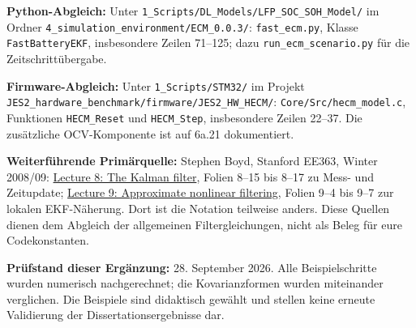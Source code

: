 \textbf{Python-Abgleich:} Unter \texttt{1\_Scripts/DL\_Models/LFP\_SOC\_SOH\_Model/} im Ordner \texttt{4\_simulation\_environment/ECM\_0.0.3/}: \texttt{fast\_ecm.py}, Klasse \texttt{FastBatteryEKF}, insbesondere Zeilen 71--125; dazu \texttt{run\_ecm\_scenario.py} für die Zeitschrittübergabe.

\textbf{Firmware-Abgleich:} Unter \texttt{1\_Scripts/STM32/} im Projekt \texttt{JES2\_hardware\_benchmark/firmware/JES2\_HW\_HECM/}: \texttt{Core/Src/hecm\_model.c}, Funktionen \texttt{HECM\_Reset} und \texttt{HECM\_Step}, insbesondere Zeilen 22--37. Die zusätzliche OCV-Komponente ist auf 6a.21 dokumentiert.

\textbf{Weiterführende Primärquelle:} Stephen Boyd, Stanford EE363, Winter 2008/09: \href{https://ee363.stanford.edu/archive/lectures/kf.pdf}{Lecture 8: The Kalman filter}, Folien 8--15 bis 8--17 zu Mess- und Zeitupdate; \href{https://ee363.stanford.edu/archive/lectures/nlfilt.pdf}{Lecture 9: Approximate nonlinear filtering}, Folien 9--4 bis 9--7 zur lokalen EKF-Näherung. Dort ist die Notation teilweise anders. Diese Quellen dienen dem Abgleich der allgemeinen Filtergleichungen, nicht als Beleg für eure Codekonstanten.

\textbf{Prüfstand dieser Ergänzung:} 28. September 2026. Alle Beispielschritte wurden numerisch nachgerechnet; die Kovarianzformen wurden miteinander verglichen. Die Beispiele sind didaktisch gewählt und stellen keine erneute Validierung der Dissertationsergebnisse dar.
\label{ecm:end}

